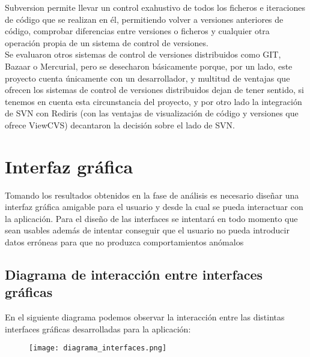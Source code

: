 Subversion permite llevar un control exahustivo de todos los ficheros e iteraciones de código que se realizan en él,
permitiendo volver a versiones anteriores de código, comprobar diferencias entre versiones o ficheros y cualquier otra
operación propia de un sistema de control de versiones. \\

Se evaluaron otros sistemas de control de versiones distribuidos como GIT, Bazaar o Mercurial, pero se desecharon
básicamente porque, por un lado, este proyecto cuenta únicamente con un desarrollador, y multitud de ventajas que
ofrecen los sistemas de control de versiones distribuidos dejan de tener sentido, si tenemos en cuenta esta circunstancia
del proyecto, y por otro lado la integración de SVN con Rediris (con las ventajas de visualización de código y versiones
que ofrece ViewCVS) decantaron la decisión sobre el lado de SVN.

\section{Interfaz gráfica}

Tomando los resultados obtenidos en la fase de análisis es necesario diseñar una interfaz gráfica amigable
para el usuario y desde la cual se pueda interactuar con la aplicación. Para el diseño de las interfaces
se intentará en todo momento que sean usables además de intentar conseguir que el usuario no pueda
introducir datos erróneas para que no produzca comportamientos anómalos

\subsection{Diagrama de interacción entre interfaces gráficas}

En el siguiente diagrama podemos observar la interacción entre las distintas interfaces gráficas desarrolladas
para la aplicación: \\

\begin{figure}[h]
  \label{diagrama_interaccion_interfaces}
  \begin{center}
    \texttt{[image: diagrama\_interfaces.png]}
  \end{center}
  \caption{}
\end{figure}

